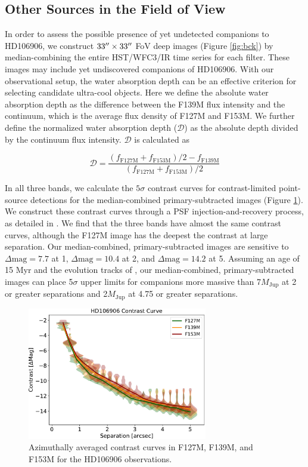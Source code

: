 \documentclass[twocolumn]{aastex62}
\newcommand{\mjup}{\ensuremath{M_\mathrm{Jup}}\xspace}
\begin{document}
\subsection{Other Sources in the Field of View}
In order to assess the possible presence of yet undetected companions to HD106906, we construct $33\mbox{$^{\prime\prime}$}\times33\mbox{$^{\prime\prime}$}$ FoV deep images (Figure \ref{fig:bck}) by median-combining the entire HST/WFC3/IR time series for each filter. These images may include yet undiscovered companions of HD106906. With our observational setup, the water absorption depth can be an effective criterion for selecting candidate ultra-cool objects. Here we define the absolute water absorption depth as the difference between the F139M flux intensity and the continuum, which is the average flux {density} of F127M and F153M. We further define the normalized water absorption depth ($\mathcal{D}$) as the absolute depth divided by the continuum flux intensity. $\mathcal{D}$ is calculated as

\begin{equation}
\mathcal{D} = \frac{(f_{\mathrm{F127M}} + f_{\mathrm{F153M}})/2 - f_{\mathrm{F139M}}}{(f_{\mathrm{F127M}} + f_{\mathrm{F153M}})/2}
\end{equation}

In all three bands, we calculate the $5\sigma$ contrast curves for contrast-limited point-source detections for the median-combined primary-subtracted images (Figure \ref{fig:contrast_curve}). We construct these contrast curves through a PSF injection-and-recovery process, as detailed in  \citet{Zhou2019}.  We find that the three bands  have almost the same contrast curves, although the F127M image has the deepest the contrast at large separation.  Our median-combined, primary-subtracted images are sensitive to $\Delta \mbox{mag}=7.7$ at 1\arcsec, $\Delta \mbox{mag}=10.4$ at 2\arcsec, and $\Delta \mbox{mag}=14.2$ at 5\arcsec. Assuming an age of 15 Myr and the evolution tracks of \citet{Saumon2008}, our median-combined, primary-subtracted images can place 5$\sigma$ upper limits for companions more massive than 7\mjup{} at 2\arcsec{} or greater  separations and 2\mjup{} at 4.75\arcsec{} or greater  separations.

\begin{figure}
  \centering
  \includegraphics[width=0.7\textwidth]{figures/contrast_curve.pdf}
  \caption{Azimuthally averaged contrast curves in F127M, F139M, and F153M for the HD106906 observations.}
  \label{fig:contrast_curve}
\end{figure}
\end{document}
